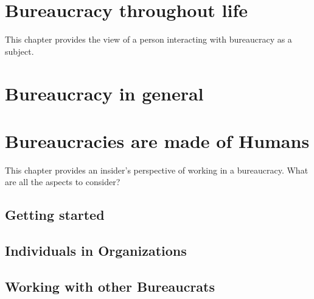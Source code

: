 \documentclass{book}
\begin{document}
\chapter{Bureaucracy throughout life\label{b_throughout_life}}
This chapter provides the view of a person interacting with bureaucracy as a \gls{subject}. 


\chapter{Bureaucracy in general}
  
  
  
  


\chapter{Bureaucracies are made of Humans\label{b_made_of_humans}}

This chapter provides an insider's perspective of working in a bureaucracy. What are all the aspects to consider?

  \section{Getting started}
    
    
    
    
  \section{Individuals in Organizations}
    
    
    
    
  \section{Working with other Bureaucrats}
    
    
    
  
    
    
\end{document}
